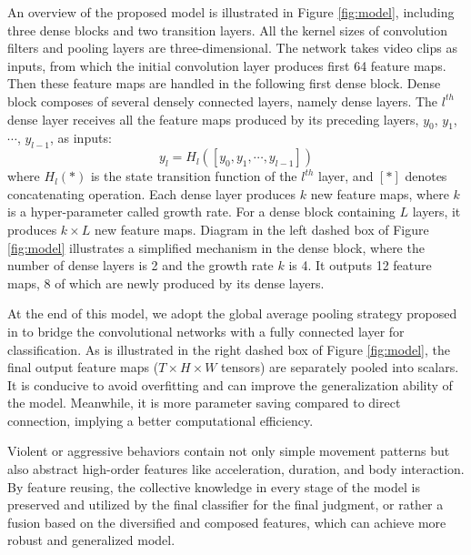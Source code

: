 \documentclass[10pt,twocolumn,letterpaper]{article}
\begin{document}
An overview of the proposed model is illustrated in Figure \ref{fig:model}, including three dense blocks and two transition layers. 
All the kernel sizes of convolution filters and pooling layers are three-dimensional. 
The network takes video clips as inputs, from which the initial convolution layer produces first 64 feature maps. 
Then these feature maps are handled in the following first dense block. 
Dense block composes of several densely connected layers, namely dense layers.
The $l^{th}$ dense layer receives all the feature maps produced by its preceding layers, $y_0$, $y_1$, $\cdots$, $y_{l-1}$, as inputs:
\begin{equation}
\label{eq:densenet}
y_l = H_l\left([y_0, y_1, \cdots, y_{l-1}]\right)
\end{equation}
where $H_l(*)$ is the state transition function of the $l^{th}$ layer, and $[*]$ denotes concatenating operation.
Each dense layer produces $k$ new feature maps, where $k$ is a hyper-parameter called growth rate. 
For a dense block containing $L$ layers, it produces $k \times L$ new feature maps.
Diagram in the left dashed box of Figure \ref{fig:model} illustrates a simplified mechanism in the dense block, where the number of dense layers is 2 and the growth rate $k$ is 4.
It outputs 12 feature maps, 8 of which are newly produced by its dense layers.

At the end of this model, we adopt the global average pooling strategy proposed in \cite{NinN} to bridge the convolutional networks with a fully connected layer for classification.
As is illustrated in the right dashed box of Figure \ref{fig:model}, the final output feature maps ($T \times H \times W$ tensors) are separately pooled into scalars.
It is conducive to avoid overfitting and can improve the generalization ability of the model. 
Meanwhile, it is more parameter saving compared to direct connection, implying a better computational efficiency.

Violent or aggressive behaviors contain not only simple movement patterns but also abstract high-order features like acceleration, duration, and body interaction.  
By feature reusing, the collective knowledge in every stage of the model is preserved and utilized by the final classifier for the final judgment, or rather a fusion based on the diversified and composed features, which can achieve more robust and generalized model. 

\end{document}
